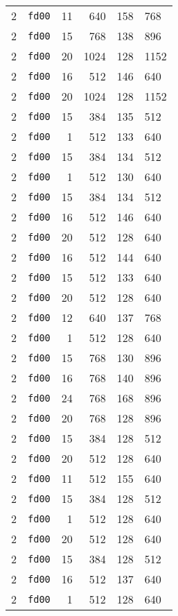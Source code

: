 \documentclass{article}
\begin{document}
\begin{table}[h!]
\begin{tabular}{llrrrl}
    2 & \texttt{fd00} & 11 & 640 & 158 & 768 \\
    2 & \texttt{fd00} & 15 & 768 & 138 & 896 \\
    2 & \texttt{fd00} & 20 & 1024 & 128 & 1152 \\
    2 & \texttt{fd00} & 16 & 512 & 146 & 640 \\
    2 & \texttt{fd00} & 20 & 1024 & 128 & 1152 \\
    2 & \texttt{fd00} & 15 & 384 & 135 & 512 \\
    2 & \texttt{fd00} & 1 & 512 & 133 & 640 \\
    2 & \texttt{fd00} & 15 & 384 & 134 & 512 \\
    2 & \texttt{fd00} & 1 & 512 & 130 & 640 \\
    2 & \texttt{fd00} & 15 & 384 & 134 & 512 \\
    2 & \texttt{fd00} & 16 & 512 & 146 & 640 \\
    2 & \texttt{fd00} & 20 & 512 & 128 & 640 \\
    2 & \texttt{fd00} & 16 & 512 & 144 & 640 \\
    2 & \texttt{fd00} & 15 & 512 & 133 & 640 \\
    2 & \texttt{fd00} & 20 & 512 & 128 & 640 \\
    2 & \texttt{fd00} & 12 & 640 & 137 & 768 \\
    2 & \texttt{fd00} & 1 & 512 & 128 & 640 \\
    2 & \texttt{fd00} & 15 & 768 & 130 & 896 \\
    2 & \texttt{fd00} & 16 & 768 & 140 & 896 \\
    2 & \texttt{fd00} & 24 & 768 & 168 & 896 \\
    2 & \texttt{fd00} & 20 & 768 & 128 & 896 \\
    2 & \texttt{fd00} & 15 & 384 & 128 & 512 \\
    2 & \texttt{fd00} & 20 & 512 & 128 & 640 \\
    2 & \texttt{fd00} & 11 & 512 & 155 & 640 \\
    2 & \texttt{fd00} & 15 & 384 & 128 & 512 \\
    2 & \texttt{fd00} & 1 & 512 & 128 & 640 \\
    2 & \texttt{fd00} & 20 & 512 & 128 & 640 \\
    2 & \texttt{fd00} & 15 & 384 & 128 & 512 \\
    2 & \texttt{fd00} & 16 & 512 & 137 & 640 \\
    2 & \texttt{fd00} & 1 & 512 & 128 & 640 \\

\end{tabular}
\end{table}
\end{document}
